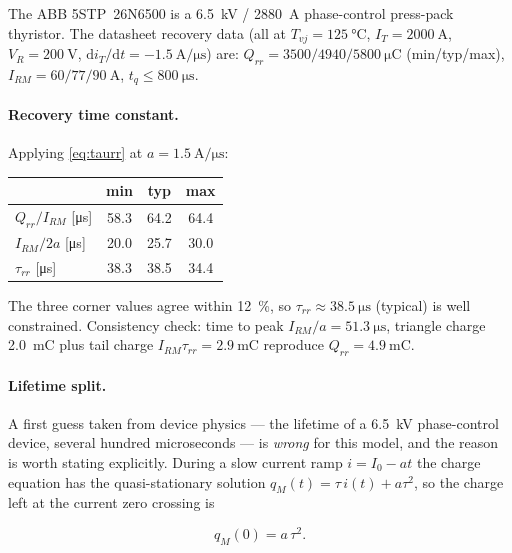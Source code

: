 \documentclass[11pt,a4paper]{article}
\begin{document}
The ABB 5STP~26N6500 \cite{abb26n6500} is a \SI{6.5}{\kilo\volt} /
\SI{2880}{\ampere} phase-control press-pack thyristor. The datasheet
recovery data (all at $T_{vj} = \SI{125}{\celsius}$,
$I_T = \SI{2000}{\ampere}$, $V_R = \SI{200}{\volt}$,
$\mathrm{d}i_T/\mathrm{d}t = \SI{-1.5}{\ampere\per\micro\second}$) are:
$Q_{rr} = 3500/4940/5800~\si{\micro\coulomb}$ (min/typ/max),
$I_{RM} = 60/77/90~\si{\ampere}$, $t_q \le \SI{800}{\micro\second}$.

\paragraph{Recovery time constant.} Applying \eqref{eq:taurr} at
$a = \SI{1.5}{\ampere\per\micro\second}$:

\begin{center}
\begin{tabular}{lccc}
\toprule
 & min & typ & max \\
\midrule
$Q_{rr}/I_{RM}$ [\si{\micro\second}] & 58.3 & 64.2 & 64.4 \\
$I_{RM}/2a$ [\si{\micro\second}]     & 20.0 & 25.7 & 30.0 \\
$\tau_{rr}$ [\si{\micro\second}]     & 38.3 & 38.5 & 34.4 \\
\bottomrule
\end{tabular}
\end{center}

The three corner values agree within \SI{12}{\percent}, so
$\tau_{rr} \approx \SI{38.5}{\micro\second}$ (typical) is well constrained.
Consistency check: time to peak $I_{RM}/a = \SI{51.3}{\micro\second}$,
triangle charge \SI{2.0}{\milli\coulomb} plus tail charge
$I_{RM}\tau_{rr} = \SI{2.9}{\milli\coulomb}$ reproduce
$Q_{rr} = \SI{4.9}{\milli\coulomb}$.

\paragraph{Lifetime split.} A first guess taken from device physics --- the
lifetime of a \SI{6.5}{\kilo\volt} phase-control device, several hundred
microseconds --- is \emph{wrong} for this model, and the reason is worth
stating explicitly. During a slow current ramp $i = I_0 - a t$ the charge
equation has the quasi-stationary solution $q_M(t) = \tau\,i(t) + a\tau^2$,
so the charge left at the current zero crossing is

\begin{equation}
  q_M(0) = a\,\tau^2 .
  \label{eq:qM0}
\end{equation}
\end{document}
